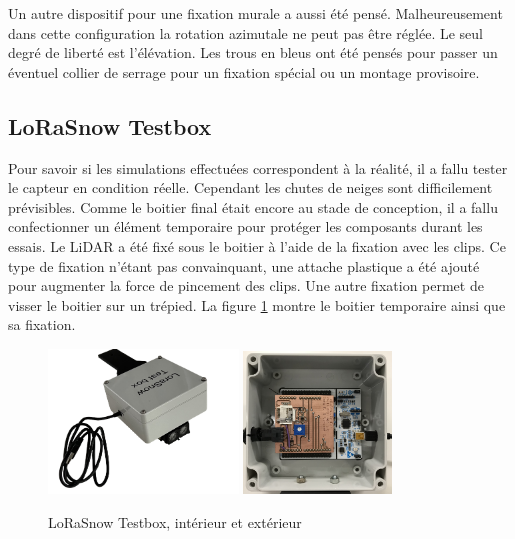 Un autre dispositif pour une fixation murale a aussi été pensé. Malheureusement dans cette configuration 
la rotation azimutale ne peut pas être réglée. Le seul degré de liberté est l’élévation. Les trous en 
bleus ont été pensés pour passer un éventuel collier de serrage pour un fixation spécial ou un montage 
provisoire.

\subsection{LoRaSnow Testbox}

Pour savoir si les simulations effectuées correspondent à la réalité, il a fallu tester le capteur 
en condition réelle. Cependant les chutes de neiges sont difficilement prévisibles. Comme le boitier final était 
encore au stade de conception, il a fallu confectionner un élément temporaire pour protéger les composants 
durant les essais. Le LiDAR a été fixé sous le boitier à l'aide de la fixation avec les clips. Ce type de fixation 
n’étant pas convainquant, une attache plastique a été ajouté pour augmenter la force de pincement des clips. 
Une autre fixation permet de visser le boitier sur un trépied. La figure \ref{fig:testbox} montre le boitier 
temporaire ainsi que sa fixation.

\begin{figure}[H]
    \centering
    \includegraphics[width=0.45\textwidth]{Images/photos_PGA/TestBox-removebg-preview.png}
    \includegraphics[width=0.35\textwidth]{Images/photos_PGA/testboxinside.jpg}
    \caption{LoRaSnow Testbox, intérieur et extérieur}
    \label{fig:testbox}
\end{figure}